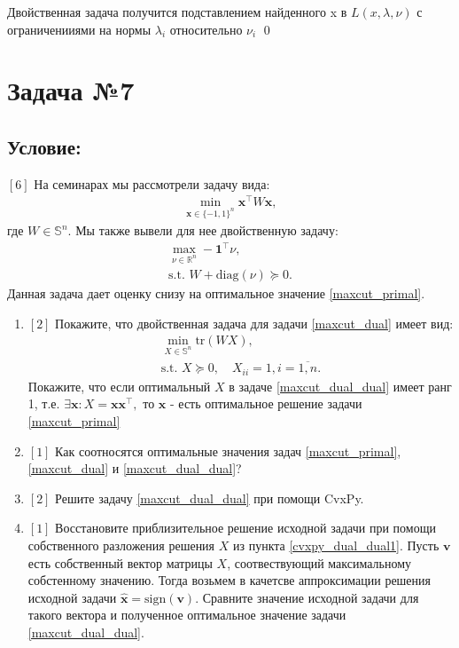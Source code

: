 \documentclass[a4paper,12pt]{article}
\begin{document}
Двойственная задача получится подставлением найденного x в $L(x, \lambda, \nu)$ с ограниченииями на нормы $\lambda_i$ относительно $\nu_i$ \qed

\newpage
\section*{Задача №7}
\subsection*{Условие:}

 \label{maxcut} $[6]$ На семинарах мы рассмотрели задачу вида:
        \begin{equation}
        \label{maxcut_primal}
        \begin{aligned}
      \min_{\mathbf{x}\in \{-1, 1\}^n } \mathbf{x}^\top W \mathbf{x},
      \end{aligned}
    \end{equation}
    где $W\in\mathbb{S}^n$. Мы также вывели для нее двойственную задачу:
            \begin{equation}
        \label{maxcut_dual}
        \begin{aligned}
      \max_{\nu\in\mathbb{R}^n} -\mathbf{1}^\top \nu,\\
      \text{s.t. } W+\text{diag}(\nu)\succeq 0.
        \end{aligned}
    \end{equation}
Данная задача дает оценку снизу на оптимальное значение \eqref{maxcut_primal}. 
\begin{enumerate}
\item $[2]$ Покажите, что двойственная задача для задачи  \eqref{maxcut_dual} имеет вид:
            \begin{equation}
        \label{maxcut_dual_dual}
        \begin{aligned}
      \min_{X \in \mathbb{S}^n } \text{tr}(WX),\\
      \text{s.t. } X\succeq 0,\quad X_{ii}=1,i=\overline{1,n}.
        \end{aligned}
    \end{equation}
    Покажите, что если оптимальный $X$ в задаче \eqref{maxcut_dual_dual} имеет ранг 1, т.е. $\exists \mathbf{x}: X=\mathbf{x}\mathbf{x}^\top,$ то $\mathbf{x}$ - есть оптимальное решение задачи \eqref{maxcut_primal}
\item $[1]$ Как соотносятся оптимальные значения задач \eqref{maxcut_primal}, \eqref{maxcut_dual} и \eqref{maxcut_dual_dual}?
\item \label{cvxpy_dual_dual1} $[2]$ Решите задачу \eqref{maxcut_dual_dual} при помощи CvxPy. 
\item $[1]$ Восстановите приблизительное решение исходной задачи при помощи собственного разложения решения $X$ из пункта \ref{cvxpy_dual_dual1}. Пусть $\mathbf{v}$ есть собственный вектор матрицы $X$, соотвествующий максимальному собстенному значению. Тогда возьмем в качетсве аппроксимации решения исходной задачи $\hat{\mathbf{x}}=\text{sign} (\mathbf{v}).$ Сравните значение исходной задачи для такого вектора и полученное оптимальное значение задачи \eqref{maxcut_dual_dual}.


\end{enumerate}
\end{document}
